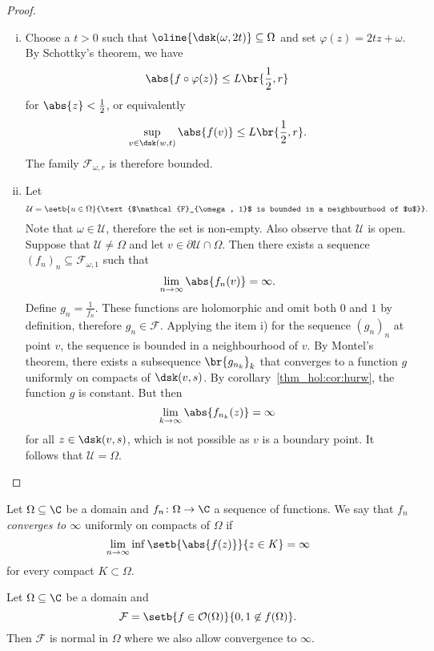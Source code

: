\begin{proof}
\phantom{a}
\begin{enumerate}[i)]
\item Choose a $t > 0$ such that
$\oline{\dsk(\omega, 2t)} \subseteq \Omega$ and set
$\varphi(z) = 2tz + \omega$. By Schottky's theorem, we have
\[
\abs{f \circ \varphi(z)} \leq L \br{\frac{1}{2}, r}
\]
for $\abs{z} < \frac{1}{2}$, or equivalently
\[
\sup_{v \in \dsk(w, t)} \abs{f(v)} \leq L \br{\frac{1}{2}, r}.
\]
The family $\mathcal{F}_{\omega, r}$ is therefore bounded.

\item Let
\[
\mathcal{U} =
\setb{u \in \Omega}
{\text{$\mathcal{F}_{\omega, 1}$ is bounded in a neighbourhood of
$u$}}.
\]
Note that $\omega \in \mathcal{U}$, therefore the set is non-empty.
Also observe that $\mathcal{U}$ is open. Suppose that
$\mathcal{U} \ne \Omega$ and let
$v \in \partial \mathcal{U} \cap \Omega$. Then there exists a
sequence
$(f_n)_n \subseteq \mathcal{F}_{\omega, 1}$ such that
\[
\lim_{n \to \infty} \abs{f_n(v)} = \infty.
\]
Define $g_n = \frac{1}{f_n}$. These functions are holomorphic and
omit both $0$ and $1$ by definition, therefore
$g_n \in \mathcal{F}$. Applying the item i) for the sequence
$(g_n)_n$ at point $v$, the sequence is bounded in a neighbourhood
of $v$. By Montel's theorem, there exists a subsequence
$\br{g_{n_k}}_k$ that converges to a function $g$ uniformly on
compacts of $\dsk(v, s)$. By corollary~\ref{thm_hol:cor:hurw},
the function $g$ is constant. But then
\[
\lim_{k \to \infty} \abs{f_{n_k}(z)} = \infty
\]
for all $z \in \dsk(v, s)$, which is not possible as $v$ is a
boundary point. It follows that $\mathcal{U} = \Omega$. \qedhere
\end{enumerate}
\end{proof}

\begin{definicija}
Let $\Omega \subseteq \C$ be a domain and
$f_n \colon \Omega \to \C$ a sequence of functions. We say that
$f_n$ \emph{converges to $\infty$}
uniformly on compacts of $\Omega$ if
\[
\lim_{n \to \infty} \inf \setb{\abs{f(z)}}{z \in K} = \infty
\]
for every compact $K \subset \Omega$.
\end{definicija}

\begin{izrek}
Let $\Omega \subseteq \C$ be a domain and
\[
\mathcal{F} =
\setb{f \in \mathcal{O}(\Omega)}{0, 1 \not \in f(\Omega)}.
\]
Then $\mathcal{F}$ is normal in $\Omega$ where we also allow
convergence to $\infty$.
\end{izrek}

